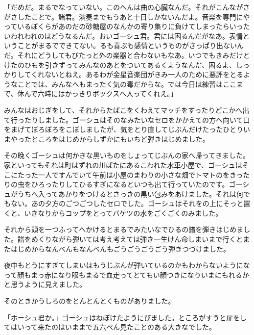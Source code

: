 \documentclass[uplatex,a5paper,twoside]{jsarticle}
\begin{document}
「だめだ。まるでなっていない。このへんは曲の心臓なんだ。それがこんながさがさしたことで。諸君。演奏までもうあと十日しかないんだよ。音楽を専門にやっているぼくらがあのだの砂糖屋のなんかの寄り集りに負けてしまったらいったいわれわれのはどうなるんだ。おいゴーシュ君。君には困るんだがなあ。表情ということがまるでできてない。るも喜ぶも感情というものがさっぱり出ないんだ。それにどうしてもぴたっと外の楽器と合わないもなあ。いつでもきみだけとけたのひもを引きずってみんなのあとをついてあるくようなんだ、困るよ、しっかりしてくれないとねえ。あるわが金星音楽団がきみ一人のために悪評をとるようなことでは、みんなへもまったく気の毒だからな。では今日は練習はここまで、休んで六時にはかっきりボックスへ入ってくれえ。」

みんなはおじぎをして、それからたばこをくわえてマッチをすったりどこかへ出て行ったりしました。ゴーシュはそのなみたいなセロをかかえての方へ向いて口をまげてぼろぼろをこぼしましたが、気をとり直してじぶんだけたったひとりいまやったところをはじめからしずかにもいちど弾きはじめました。

その晩くゴーシュは何かきな黒いものをしょってじぶんの家へ帰ってきました。家といってもそれは町はずれの川ばたにあるこわれた水車小屋で、ゴーシュはそこにたった一人ですんでいて午前は小屋のまわりの小さな畑でトマトのをきったりの虫をひろったりしてひるすぎになるといつも出て行っていたのです。ゴーシュがうちへ入ってあかりをつけるとさっきの黒い包みをあけました。それは何でもない。あの夕方のごつごつしたセロでした。ゴーシュはそれをの上にそっと置くと、いきなりからコップをとってバケツの水をごくごくのみました。

それから頭を一つふってへかけるとまるでみたいなでひるの譜を弾きはじめました。譜をめくりながら弾いては考え考えては弾き一生けん命しまいまで行くとまたはじめからなんべんもなんべんもごうごうごうごう弾きつづけました。

夜中もとうにすぎてしまいはもうじぶんが弾いているのかもわからないようになって顔もまっ赤になり眼もまるで血走ってとてもい顔つきになりいまにもれるかと思うように見えました。

そのときかうしろのをとんとんとくものがありました。

「ホーシュ君か。」ゴーシュはねぼけたようにびました。ところがすうと扉をしてはいって来たのはいままで五六ぺん見たことのある大きなでした。
\end{document}
